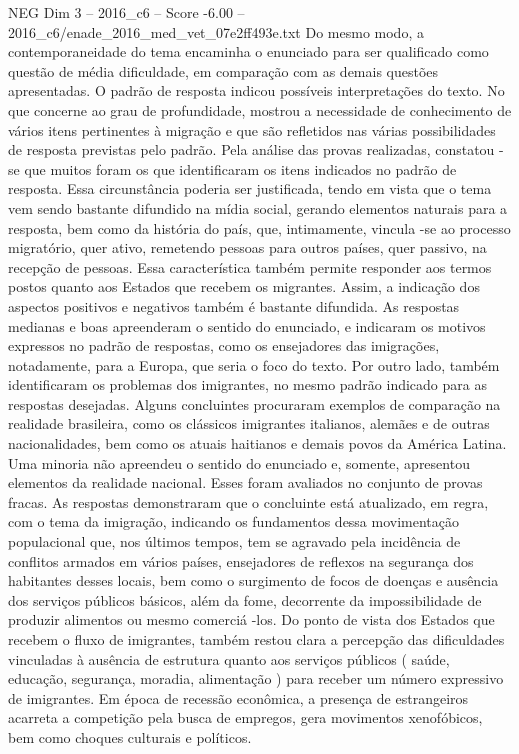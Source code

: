 \begin{textsample}{NEG Dim 3 – 2016\_c6 – Score -6.00 – 2016\_c6/enade\_2016\_med\_vet\_07e2ff493e.txt}
Do mesmo modo, a contemporaneidade do tema encaminha o enunciado para ser qualificado como questão de média dificuldade, em comparação com as demais questões apresentadas.
O padrão de resposta indicou possíveis interpretações do texto.
No que concerne ao grau de profundidade, mostrou a necessidade de conhecimento de vários itens pertinentes à migração e que são refletidos nas várias possibilidades de resposta previstas pelo padrão.
Pela análise das provas realizadas, constatou -se que muitos foram os que identificaram os itens indicados no padrão de resposta.
Essa circunstância poderia ser justificada, tendo em vista que o tema vem sendo bastante difundido na mídia social, gerando elementos naturais para a resposta, bem como da história do país, que, intimamente, vincula -se ao processo migratório, quer ativo, remetendo pessoas para outros países, quer passivo, na recepção de pessoas.
Essa característica também permite responder aos termos postos quanto aos Estados que recebem os migrantes.
Assim, a indicação dos aspectos positivos e negativos também é bastante difundida.
As respostas medianas e boas apreenderam o sentido do enunciado, e indicaram os motivos expressos no padrão de respostas, como os ensejadores das imigrações, notadamente, para a Europa, que seria o foco do texto.
Por outro lado, também identificaram os problemas dos imigrantes, no mesmo padrão indicado para as respostas desejadas.
Alguns concluintes procuraram exemplos de comparação na realidade brasileira, como os clássicos imigrantes italianos, alemães e de outras nacionalidades, bem como os atuais haitianos e demais povos da América Latina.
Uma minoria não apreendeu o sentido do enunciado e, somente, apresentou elementos da realidade nacional.
Esses foram avaliados no conjunto de provas fracas.
As respostas demonstraram que o concluinte está atualizado, em regra, com o tema da imigração, indicando os fundamentos dessa movimentação populacional que, nos últimos tempos, tem se agravado pela incidência de conflitos armados em vários países, ensejadores de reflexos na segurança dos habitantes desses locais, bem como o surgimento de focos de doenças e ausência dos serviços públicos básicos, além da fome, decorrente da impossibilidade de produzir alimentos ou mesmo comerciá -los.
Do ponto de vista dos Estados que recebem o fluxo de imigrantes, também restou clara a percepção das dificuldades vinculadas à ausência de estrutura quanto aos serviços públicos ( saúde, educação, segurança, moradia, alimentação ) para receber um número expressivo de imigrantes.
Em época de recessão econômica, a presença de estrangeiros acarreta a competição pela busca de empregos, gera movimentos xenofóbicos, bem como choques culturais e políticos.

\end{textsample}
